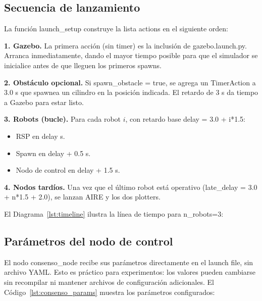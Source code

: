 \subsection{Secuencia de lanzamiento}

La función launch\_setup construye la lista actions en el siguiente orden:

\textbf{1. Gazebo.} La primera acción (sin timer) es la inclusión de gazebo.launch.py. Arranca inmediatamente, dando el mayor tiempo posible para que el simulador se inicialice antes de que lleguen los primeros spawns.

\textbf{2. Obstáculo opcional.} Si spawn\_obstacle = true, se agrega un TimerAction a 3.0 s que spawnea un cilindro en la posición indicada. El retardo de 3 s da tiempo a Gazebo para estar listo.

\textbf{3. Robots (bucle).} Para cada robot $i$, con retardo base delay = 3.0 + i*1.5:
\begin{itemize}
  \item RSP en delay s.
  \item Spawn en delay + 0.5 s.
  \item Nodo de control en delay + 1.5 s.
\end{itemize}

\textbf{4. Nodos tardíos.} Una vez que el último robot está operativo (late\_delay = 3.0 + n*1.5 + 2.0), se lanzan AIRE y los dos plotters.

El Diagrama~\ref{lst:timeline} ilustra la línea de tiempo para n\_robots=3:



\subsection{Parámetros del nodo de control}

El nodo consenso\_node recibe sus parámetros directamente en el launch file, sin archivo YAML. Esto es práctico para experimentos: los valores pueden cambiarse sin recompilar ni mantener archivos de configuración adicionales. El Código~\ref{lst:consenso_params} muestra los parámetros configurados:



